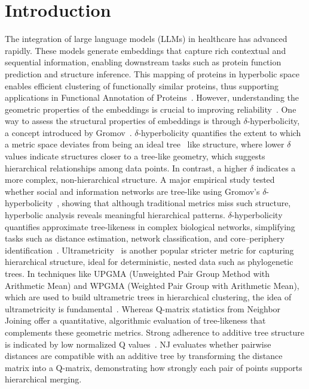 \documentclass[]{Liebert_Author_revised}
\begin{document}
\section{Introduction}
\label{sec_intro}
The integration of large language models (LLMs) in healthcare has advanced rapidly. These models generate embeddings that capture rich contextual and sequential information, enabling downstream tasks such as protein function prediction and structure inference. This mapping of proteins in hyperbolic space~\citeauthor{dress2012basic} enables efficient clustering of functionally similar proteins, thus supporting applications in Functional Annotation of Proteins~\citeauthor{ali2023protein}. However, understanding the geometric properties of the embeddings is crucial to improving reliability~\citeauthor{nickel2017poincare}.
One way to assess the structural properties of embeddings is through $\delta$-hyperbolicity, a concept introduced by Gromov~\citeauthor{gromov1987hyperbolic}. $\delta$-hyperbolicity quantifies the extent to which a metric space deviates from being an ideal tree~\citeauthor{yang2024enhancing} like structure, where lower $\delta$ values indicate structures closer to a tree-like geometry, which suggests hierarchical relationships among data points. 
In contrast, a higher  $\delta$ indicates a more complex, non-hierarchical structure. 
A major empirical study tested whether social and information networks are tree-like using Gromov’s $\delta$-hyperbolicity~\citeauthor{adcock2013tree}, showing that although traditional metrics miss such structure, hyperbolic analysis reveals meaningful hierarchical patterns.
$\delta$-hyperbolicity quantifies approximate tree-likeness in complex biological networks, simplifying tasks such as distance estimation, network classification, and core–periphery identification~\citeauthor{abu2016metric}. Ultrametricity~\citeauthor{chierchia2019ultrametric} is another popular stricter metric for capturing hierarchical structure, ideal for deterministic, nested data such as phylogenetic trees. In techniques like UPGMA (Unweighted Pair Group Method with Arithmetic Mean) and WPGMA (Weighted Pair Group with Arithmetic Mean), which are used to build ultrametric trees in hierarchical clustering, the idea of ultrametricity is fundamental~\citeauthor{dubes1999cluster}. Whereas Q-matrix statistics from Neighbor Joining offer a quantitative, algorithmic evaluation of tree-likeness that complements these geometric metrics. Strong adherence to additive tree structure is indicated by low normalized Q values~\citeauthor{gascuel2006neighbor,atteson1999performance}. NJ evaluates whether pairwise distances are compatible with an additive tree by transforming the distance matrix into a Q-matrix, demonstrating how strongly each pair of points supports hierarchical merging. 
\end{document}
